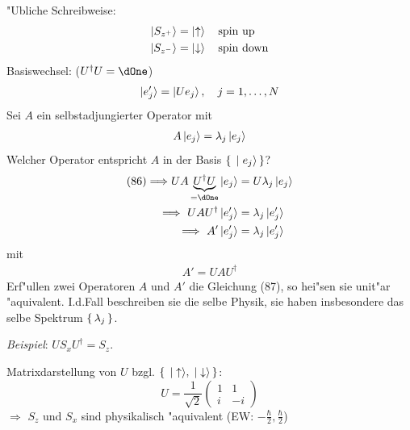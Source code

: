 \documentclass[a4paper]{scrartcl}
\begin{document}
{"Ubliche Schreibweise:
\begin{align}
\begin{split}
\ket{S_{z^+}} & = \ket{ \uparrow } \quad \mathrm{spin \ up} \\
\ket{S_{z^-}} & = \ket \downarrow \quad \mathrm{spin \ down}
\end{split}
\end{align}
Basiswechsel: ($U^\dagger U = \dOne$)
\begin{align}
\begin{split}
\ket{ e_j'} = \ket{ U e_j}, \quad j=1, \ldots, N
\end{split}
\end{align}
Sei $A$ ein selbstadjungierter Operator mit
\begin{align}
A \ket{ e_j} = \lambda_j \ket{ e_j }
\end{align}
Welcher Operator entspricht $A$ in der Basis $\set{ \ket{e_j}}$?
\begin{align*}
\mathrm{(86)} \Longrightarrow U A \underbrace{ U^\dagger U}_{= \dOne} \ket{e_j} & = U \lambda_j \ket{ e_j} \\
\Longrightarrow \ UAU^\dagger \ket{e_j'} & = \lambda_j \ket{e_j'} \\
\Longrightarrow \ A' \ket{ e_j'} & = \lambda_j \ket{ e_j'}
\end{align*}
mit
\begin{align}
A' = UAU^\dagger
\end{align}
Erf"ullen zwei Operatoren $A$ und $A'$ die Gleichung (87), so hei"sen sie unit"ar "aquivalent. I.d.Fall beschreiben sie die selbe Physik, sie haben insbesondere das selbe Spektrum $\set{ \lambda_j }$.

\emph{Beispiel}: $U S_x U^\dagger = S_z$.

Matrixdarstellung von $U$ bzgl. $\set{ \ket \uparrow, \ket \downarrow}$:
$$U = \frac1{\sqrt2} \begin{pmatrix} 1 & 1 \\ i & -i \end{pmatrix}$$
$\Longrightarrow$ $S_z$ und $S_x$ sind physikalisch "aquivalent (EW: $-\frac \hbar 2, \frac \hbar 2$)

}
\end{document}
